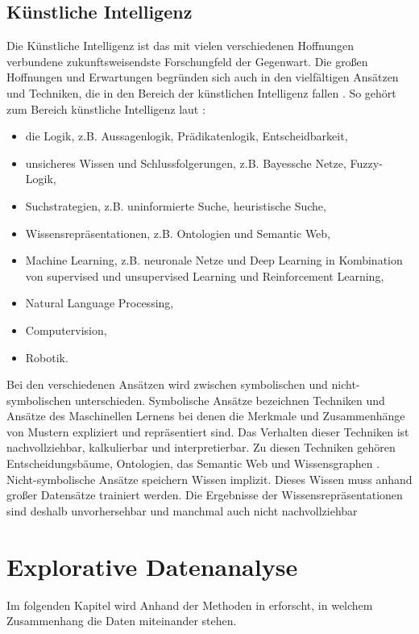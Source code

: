 \documentclass[12pt]{report}
\begin{document}
	\section{Künstliche Intelligenz} %
	\label{sec:ki}
	Die Künstliche Intelligenz ist das mit vielen verschiedenen Hoffnungen verbundene zukunftsweisendste Forschungfeld der Gegenwart. Die großen Hoffnungen und Erwartungen begründen sich auch in den vielfältigen Ansätzen und Techniken, die in den Bereich der künstlichen Intelligenz fallen \cite[S. 2]{Ege.2021b}. So gehört zum Bereich künstliche Intelligenz laut \cite[S. 2]{Ege.2021b}:
	\begin{itemize} \itemsep0pt
		\item die Logik, z.B. Aussagenlogik, Prädikatenlogik, Entscheidbarkeit,
		\item unsicheres Wissen und Schlussfolgerungen, z.B. Bayessche Netze, Fuzzy-Logik,
		\item Suchstrategien, z.B. uninformierte Suche, heuristische Suche,
		\item Wissensrepräsentationen, z.B. Ontologien und Semantic Web,
		\item Machine Learning, z.B. neuronale Netze und Deep Learning in Kombination von supervised und unsupervised Learning und Reinforcement Learning,
		\item Natural Language Processing,
		\item Computervision,
		\item Robotik.
	\end{itemize}	
	Bei den verschiedenen Ansätzen wird zwischen symbolischen und nicht-symbolischen unterschieden. Symbolische Ansätze bezeichnen Techniken und Ansätze des Maschinellen Lernens bei denen die Merkmale und Zusammenhänge von Mustern expliziert und repräsentiert sind. Das Verhalten dieser Techniken ist nachvollziehbar, kalkulierbar und interpretierbar. Zu diesen Techniken gehören Entscheidungsbäume, Ontologien, das Semantic Web und Wissensgraphen \cite[S. 9]{Ege.2021b}. Nicht-symbolische Ansätze speichern Wissen implizit. Dieses Wissen muss anhand großer Datensätze trainiert werden. Die Ergebnisse der Wissensrepräsentationen sind deshalb unvorhersehbar und manchmal auch nicht nachvollziehbar \cite[S. 9]{Ege.2021b}
	
	\chapter{Explorative Datenanalyse}
	Im folgenden Kapitel wird Anhand der Methoden in \cite{Walker.2024} %
	erforscht, in welchem Zusammenhang die Daten miteinander stehen. 
\end{document}
